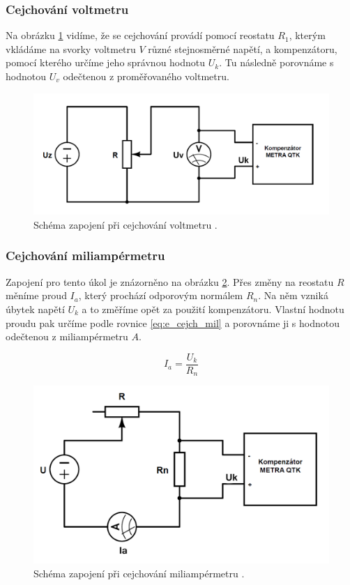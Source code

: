 \documentclass[english]{article}
\begin{document}
\subsubsection{Cejchování voltmetru}
Na obrázku \ref{fig:s_cejchovani_v} vidíme, že se cejchování provádí pomocí reostatu $R_{1}$, kterým vkládáme na svorky voltmetru $V$ různé stejnosměrné napětí, a kompenzátoru, pomocí kterého určíme jeho správnou hodnotu $U_{k}$. Tu následně porovnáme s hodnotou $U_{v}$ odečtenou z proměřovaného voltmetru.

\begin{figure}[h!]
\centering
  \includegraphics[scale=0.4]{att/7_s_cejchovani_v.png}
  \caption{Schéma zapojení při cejchování voltmetru \cite{bib:repo}.}
  \label{fig:s_cejchovani_v}
\end{figure}

\subsubsection{Cejchování miliampérmetru}
Zapojení pro tento úkol je znázorněno na obrázku \ref{fig:s_cejchovani_a}. Přes změny na reostatu $R$ měníme proud $I_{a}$, který prochází odporovým normálem $R_{n}$. Na něm vzniká úbytek napětí $U_{k}$ a to změříme opět za použití kompenzátoru. Vlastní hodnotu proudu pak určíme podle rovnice \ref{eq:e_cejch_mil} a porovnáme ji s hodnotou odečtenou z miliampérmetru $A$.

\begin{equation}
I_{a}=\frac{U_{k}}{R_{n}}
\label{eq:e_cejch_mil}
\end{equation}

\begin{figure}[h!]
\centering
  \includegraphics[scale=0.4]{att/7_s_cejchovani_a.png}
  \caption{Schéma zapojení při cejchování miliampérmetru \cite{bib:repo}.}
  \label{fig:s_cejchovani_a}
\end{figure}
\end{document}
